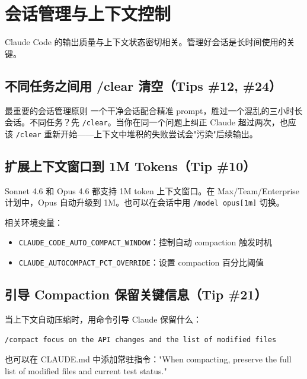 \section{会话管理与上下文控制}

Claude Code 的输出质量与上下文状态密切相关。管理好会话是长时间使用的关键。

\subsection{不同任务之间用 /clear 清空（Tips \#12, \#24）}

\begin{importantbox}{最重要的会话管理原则}
一个干净会话配合精准 prompt，胜过一个混乱的三小时长会话。不同任务？先 \texttt{/clear}。当你在同一个问题上纠正 Claude 超过两次，也应该 \texttt{/clear} 重新开始——上下文中堆积的失败尝试会"污染"后续输出。
\end{importantbox}

\subsection{扩展上下文窗口到 1M Tokens（Tip \#10）}

Sonnet 4.6 和 Opus 4.6 都支持 1M token 上下文窗口。在 Max/Team/Enterprise 计划中，Opus 自动升级到 1M。也可以在会话中用 \texttt{/model opus[1m]} 切换。

相关环境变量：
\begin{itemize}
  \item \texttt{CLAUDE\_CODE\_AUTO\_COMPACT\_WINDOW}：控制自动 compaction 触发时机
  \item \texttt{CLAUDE\_AUTOCOMPACT\_PCT\_OVERRIDE}：设置 compaction 百分比阈值
\end{itemize}

\subsection{引导 Compaction 保留关键信息（Tip \#21）}

当上下文自动压缩时，用命令引导 Claude 保留什么：

\begin{lstlisting}[caption={引导 compaction 示例}, language=bash]
/compact focus on the API changes and the list of modified files
\end{lstlisting}

也可以在 CLAUDE.md 中添加常驻指令："When compacting, preserve the full list of modified files and current test status."

